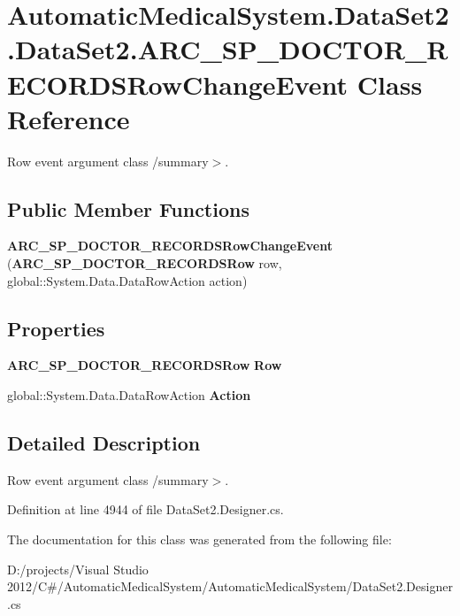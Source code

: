 \section{AutomaticMedicalSystem.DataSet2.DataSet2.ARC\_\-SP\_\-DOCTOR\_\-RECORDSRowChangeEvent Class Reference}
\label{class_automatic_medical_system_1_1_data_set2_1_1_a_r_c___s_p___d_o_c_t_o_r___r_e_c_o_r_d_s_row_change_event}
Row event argument class /summary$>$.  


\subsection*{Public Member Functions}
\begin{CompactItemize}
\item 
\textbf{ARC\_\-SP\_\-DOCTOR\_\-RECORDSRowChangeEvent} ({\bf ARC\_\-SP\_\-DOCTOR\_\-RECORDSRow} row, global::System.Data.DataRowAction action)\label{class_automatic_medical_system_1_1_data_set2_1_1_a_r_c___s_p___d_o_c_t_o_r___r_e_c_o_r_d_s_row_change_event_334bcfa07f02558fe471575a9f104bdb}

\end{CompactItemize}
\subsection*{Properties}
\begin{CompactItemize}
\item 
{\bf ARC\_\-SP\_\-DOCTOR\_\-RECORDSRow} \textbf{Row}\hspace{0.3cm}{\tt  [get]}\label{class_automatic_medical_system_1_1_data_set2_1_1_a_r_c___s_p___d_o_c_t_o_r___r_e_c_o_r_d_s_row_change_event_732c0d45228f2f216bab86c3c287503b}

\item 
global::System.Data.DataRowAction \textbf{Action}\hspace{0.3cm}{\tt  [get]}\label{class_automatic_medical_system_1_1_data_set2_1_1_a_r_c___s_p___d_o_c_t_o_r___r_e_c_o_r_d_s_row_change_event_684579df2af18185f78ffcb101ddbb15}

\end{CompactItemize}


\subsection{Detailed Description}
Row event argument class /summary$>$. 

Definition at line 4944 of file DataSet2.Designer.cs.

The documentation for this class was generated from the following file:\begin{CompactItemize}
\item 
D:/projects/Visual Studio 2012/C\#/AutomaticMedicalSystem/AutomaticMedicalSystem/DataSet2.Designer.cs\end{CompactItemize}

